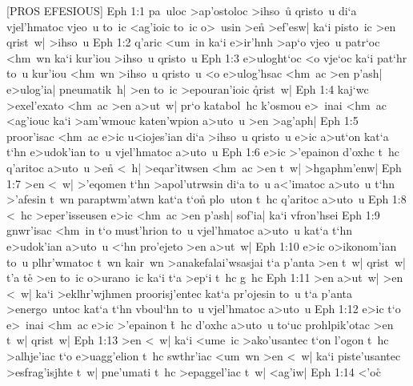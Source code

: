 [PROS EFESIOUS]
\vs Eph 1:1
pa~uloc
>ap'ostoloc
>ihso~u\r{}
qristo~u
di`a
vjel'hmatoc
vjeo~u
to~ic
<ag'ioic
to~ic
o>~usin
>en\r{}
>ef'esw|
ka`i
pisto~ic
>en
qrist~w|
>ihso~u\bibvsend
\vs Eph 1:2
q'aric
<um~in
ka`i
e>ir'hnh
>ap`o
vjeo~u
patr`oc
<hm~wn
ka`i
kur'iou
>ihso~u
qristo~u\bibvsend
\vs Eph 1:3
e>uloght`oc
<o
vje`oc
ka`i
pat`hr
to~u
kur'iou
<hm~wn
>ihso~u
qristo~u
<o
e>ulog'hsac
<hm~ac
>en
p'ash|
e>ulog'ia|
pneumatik~h|
>en
to~ic
>epouran'ioic
\r{q}rist~w|\bibvsend
{}
\vs Eph 1:4
kaj`wc
>exel'exato
<hm~ac
>en
a>ut~w|
pr`o
katabol~hc
k'osmou
e>~inai
<hm~ac
<ag'iouc
ka`i
>am'wmouc
katen'wpion
a>uto~u
>en
>ag'aph|\bibvsend
\vs Eph 1:5
proor'isac
<hm~ac
e>ic
u<iojes'ian
di`a
>ihso~u
qristo~u
e>ic
a>ut`on
kat`a
t`hn
e>udok'ian
to~u
vjel'hmatoc
a>uto~u\bibvsend
\vs Eph 1:6
e>ic
>'epainon
d'oxhc
t~hc
q'aritoc
a>uto~u
>en\r{}
<~h|
>eqar'itwsen
<hm~ac
>en
t~w|
>hgaphm'enw|\bibvsend
\vs Eph 1:7
>en
<~w|
>'eqomen
t`hn
>apol'utrwsin
di`a
to~u
a<'imatoc
a>uto~u
t`hn
>'afesin
t~wn
paraptwm'atwn
kat`a
t`on\r{}
plo~uton
t~hc
q'aritoc
a>uto~u\bibvsend
\vs Eph 1:8
<~hc
>eper'isseusen
e>ic
<hm~ac
>en
p'ash|
sof'ia|
ka`i
vfron'hsei\bibvsend
\vs Eph 1:9
gnwr'isac
<hm~in
t`o
must'hrion
to~u
vjel'hmatoc
a>uto~u
kat`a
t`hn
e>udok'ian
a>uto~u
<`hn
pro'ejeto
>en
a>ut~w|\bibvsend
\vs Eph 1:10
e>ic
o>ikonom'ian
to~u
plhr'wmatoc
t~wn
kair~wn
>anakefalai'wsasjai
t`a
p'anta
>en
t~w|
qrist~w|
t'a
te\r{}
>en
to~ic
o>urano~ic
ka`i
t`a
>ep`i
t~hc
g~hc\bibvsend
\vs Eph 1:11
>en
a>ut~w|
>en
<~w|
ka`i
>eklhr'wjhmen
proorisj'entec
kat`a
pr'ojesin
to~u
t`a
p'anta
>energo~untoc
kat`a
t`hn
vboul`hn
to~u
vjel'hmatoc
a>uto~u\bibvsend
\vs Eph 1:12
e>ic
t`o
e>~inai
<hm~ac
e>ic
>'epainon
\r{t}~hc
d'oxhc
a>uto~u
to`uc
prohlpik'otac
>en
t~w|
qrist~w|\bibvsend
\vs Eph 1:13
>en
<~w|
ka`i
<ume~ic
>ako'usantec
t`on
l'ogon
t~hc
>alhje'iac
t`o
e>uagg'elion
t~hc
swthr'iac
<um~wn
>en
<~w|
ka`i
piste'usantec
>esfrag'isjhte
t~w|
pne'umati
t~hc
>epaggel'iac
t~w|
<ag'iw|\bibvsend
\vs Eph 1:14
<'oc\r{}
